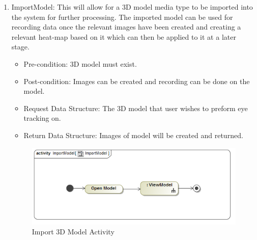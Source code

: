 	\begin{enumerate}
		\item{ImportModel:}
		\newline
		This will allow for a 3D model media type to be imported into the system for further processing. The imported model can be used for recording data once the relevant images have been created and creating a relevant heat-map based on it which can then be applied to it at a later stage.
		\begin{itemize}
			\item Pre-condition: 3D model must exist.
			\item Post-condition: Images can be created and recording can be done on the model.
			\item Request Data Structure: The 3D model that user wishes to preform eye tracking on.
			\item Return Data Structure: Images of model will be created and returned.
		\end{itemize}
		
		\begin{figure}[!ht]
			\centering
			\includegraphics[scale=0.5,width=15cm,keepaspectratio]{Diagrams/Activity_Diagram__ImportModel__ImportModel.png}
			\caption{Import 3D Model Activity}
		\end{figure}
	

\end{enumerate}
